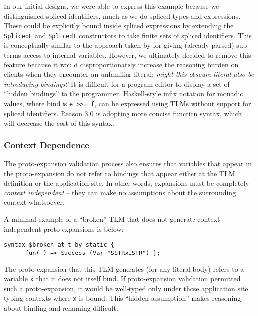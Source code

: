 \documentclass[acmsmall,review,anonymous]{acmart}\settopmatter{printfolios=true,printccs=false,printacmref=false}
\newcommand{\li}[1]{\lstinline[basicstyle=\ttfamily\fontsize{9pt}{1em}\selectfont]{#1}}
\begin{document}
In our initial designs, we were able to express this example because we distinguished spliced identifiers, much as we do spliced types and expressions. These could be explicitly bound inside spliced expressions by extending the \li{SplicedE} and \li{SplicedT} constructors to take finite sets of spliced identifiers. This is conceptually similar to the approach taken by \citet{DBLP:conf/esop/HermanW08} for giving (already parsed) sub-terms access to internal variables. However, we ultimately decided to remove this feature because it would disproportionately increase the reasoning burden on clients when they encounter an unfamiliar literal: \emph{might this obscure literal also be introducing bindings?} It is difficult for a program editor to display a set of ``hidden bindings'' to the programmer. Haskell-style infix notation for monadic values, where bind is \li{e >>= f}, can be expressed using TLMs without support for spliced identifiers. Reason 3.0 is adopting more concise function syntax, which will decrease the cost of this syntax.

\subsubsection{Context Dependence}\label{sec:context-dependence}
The proto-expansion validation process also ensures that variables that appear in the proto-expansion do not refer to bindings that appear either at the TLM definition or the application site. In other words, expansions must be completely \emph{context independent} -- they can make no assumptions about the surrounding context whatsoever. 

A minimal example of a ``broken'' TLM that does not generate context-independent proto-expansions is below:
\begin{lstlisting}[numbers=none]
    syntax $broken at t by static { 
      fun(_) => Success (Var "SSTRxESTR") };
\end{lstlisting}
The proto-expansion that this TLM generates (for any literal body) refers to a variable \li{x} that it does not itself bind. If proto-expansion validation permitted such a proto-expansion, it would be well-typed only under those application site typing contexts where \li{x} is bound. This ``hidden assumption'' makes reasoning about binding and renaming difficult.
\end{document}
